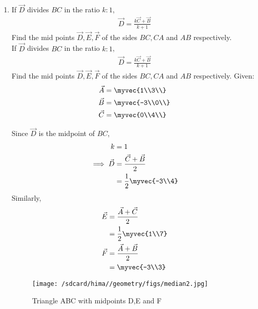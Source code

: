 \documentclass[11pt]{book}
\begin{document}
\begin{enumerate}[label=\thesection.\arabic*.,ref=\thesection.\theenumi]

\item  If $\vec{D}$ divides $BC$ in the ratio $k : 1$,
		\begin{align}
			\vec{D}= \frac{k\vec{C}+\vec{B}}{k+1}
		\end{align}
Find the mid points $\vec{D}, \vec{E}, \vec{F}$ of the sides $BC, CA$ and $AB$ respectively.\\
If $\vec{D}$ divides $BC$ in the ratio $k : 1$,
\begin{align}
\vec{D}= \frac{k\vec{C}+\vec{B}}{k+1}
\end{align}
Find the mid points $\vec{D}, \vec{E}, \vec{F}$ of the sides $BC, CA$ and $AB$ respectively.
\newline
Given:
\begin{align}
\vec{A} &= \myvec{1\\3\\}\\
\vec{B} &= \myvec{-3\\0\\}\\
\vec{C} &= \myvec{0\\4\\}
\end{align}

\solution
Since $\vec{D}$ is the midpoint of $BC$,
\begin{align}
k &= 1\\
\implies \vec{D} &= \frac{\vec{C} + \vec{B}}{2}\\
&= \frac{1}{2}\myvec{-3\\4}
\end{align}
Similarly,
\begin{align}
\vec{E} &= \frac{\vec{A} + \vec{C}}{2}\\
&= \frac{1}{2}\myvec{1\\7}\\
\vec{F} &= \frac{\vec{A} + \vec{B}}{2}\\
&= \myvec{-3\\3}
\end{align}
\begin{figure}[H]
\centering
\texttt{[image: /sdcard/hima//geometry/figs/median2.jpg]}
\caption{Triangle ABC with midpoints D,E and F}
\end{figure}  


\end{enumerate}
\end{document}
